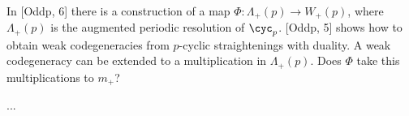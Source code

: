 \begin{question}
In [Oddp, 6] there is a construction of a map $\Phi \colon \Lambda_+(p)\to W_+(p)$, where $\Lambda_+(p)$ is the augmented periodic resolution of $\cyc_p$. [Oddp, 5] shows how to obtain weak codegeneracies from $p$-cyclic straightenings with duality. A weak codegeneracy can be extended to a multiplication in $\Lambda_+(p)$. Does $\Phi$ take this multiplications to $m_+$?
\end{question}
 \TBW
...